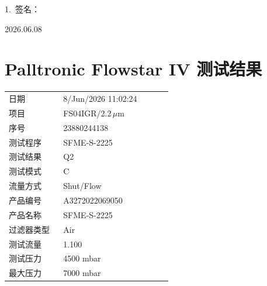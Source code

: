 \documentclass[UTF8,10pt,a4paper,fontset=fandol]{ctexart}
\newcommand{\fieldvalue}[1]{#1}
\newcommand{\handwritten}[1]{#1}
\begin{document}
1.\ 签名：

\handwritten{2026.06.08}


\newpage

\section*{Palltronic Flowstar IV 测试结果}

\begin{tabular}{@{}p{0.30\linewidth}p{0.60\linewidth}@{}}
日期 &
\fieldvalue{8/Jun/2026 11:02:24}
\\[2pt]
项目 &
\fieldvalue{FS04IGR/2.2\,$\mu$m}
\\[2pt]
序号 &
\fieldvalue{23880244138}
\\[2pt]
测试程序 &
\fieldvalue{SFME-S-2225}
\\[2pt]
测试结果 &
\fieldvalue{Q2}
\\[2pt]
测试模式 &
\fieldvalue{C}
\\[2pt]
流量方式 &
\fieldvalue{Shut/Flow}
\\[2pt]
产品编号 &
\fieldvalue{A3272022069050}
\\[2pt]
产品名称 &
\fieldvalue{SFME-S-2225}
\\[2pt]
过滤器类型 &
\fieldvalue{Air}
\\[2pt]
测试流量 &
\fieldvalue{1.100}
\\[2pt]
测试压力 &
\fieldvalue{4500 mbar}
\\[2pt]
最大压力 &
\fieldvalue{7000 mbar}
\end{tabular}

\vspace{1em}
\end{document}
